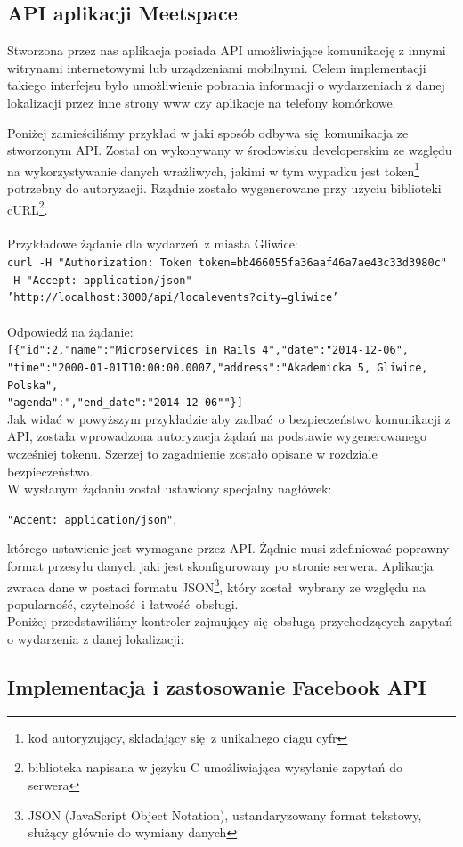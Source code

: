 \subsection{API aplikacji Meetspace}
  Stworzona przez nas aplikacja posiada API umożliwiające komunikację z innymi witrynami internetowymi lub urządzeniami mobilnymi. Celem implementacji takiego interfejsu było umożliwienie pobrania informacji o wydarzeniach z danej lokalizacji przez inne strony www czy aplikacje na telefony komórkowe.


  Poniżej zamieściliśmy przykład w jaki sposób odbywa się komunikacja ze stworzonym API. Został on wykonywany w środowisku developerskim ze względu na wykorzystywanie danych wrażliwych, jakimi w tym wypadku jest token\footnote{kod autoryzujący, składający się z unikalnego ciągu cyfr} potrzebny do autoryzacji. Rządnie zostało wygenerowane przy użyciu biblioteki cURL\footnote{biblioteka napisana w języku C umożliwiająca wysyłanie zapytań do serwera}.
  \\ \\
  Przykładowe żądanie dla wydarzeń z miasta Gliwice:\\
    \texttt{curl -H "Authorization: Token token=bb466055fa36aaf46a7ae43c33d3980c"
    -H "Accept: application/json"\\
    'http://localhost:3000/api/localevents?city=gliwice'}\\ \\
  Odpowiedź na żądanie:\\
    \texttt{[\{"id":2,"name":"Microservices in Rails 4","date":"2014-12-06",\\
    "time":"2000-01-01T10:00:00.000Z,"address":"Akademicka 5, Gliwice, Polska",\\
    "agenda":","end\_{}date":"2014-12-06""\}]}\\

  Jak widać w powyższym przykładzie aby zadbać o bezpieczeństwo komunikacji z API, została wprowadzona autoryzacja żądań na podstawie wygenerowanego wcześniej tokenu. Szerzej to zagadnienie zostało opisane w rozdziale bezpieczeństwo.\\
  W wysłanym żądaniu został ustawiony specjalny nagłówek:
  \begin{center}
    \texttt{"Accent: application/json"},
  \end{center}
  którego ustawienie jest wymagane przez API. Żądnie musi zdefiniować poprawny format przesyłu danych jaki jest skonfigurowany po stronie serwera.
  Aplikacja zwraca dane w postaci formatu JSON\footnote{JSON (JavaScript Object Notation), ustandaryzowany format tekstowy, służący głównie do wymiany danych\cite{json}}, który został wybrany ze względu na popularność, czytelność i łatwość obsługi.\\
  Poniżej przedstawiliśmy kontroler zajmujący się obsługą przychodzących zapytań o wydarzenia z danej lokalizacji:\\

  

\subsection{Implementacja i zastosowanie Facebook API}

